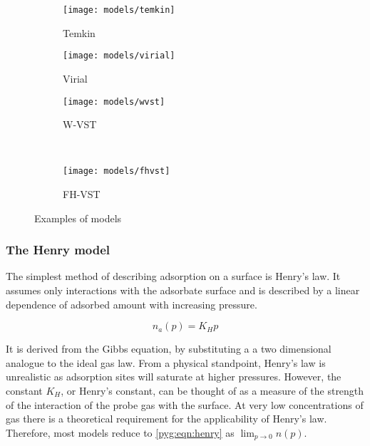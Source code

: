\begin{figure}[p]
\begin{subfigure}{0.3\linewidth}
		\parbox[c]{1.0\linewidth}{\caption{Temkin}%
			\label{pyg:fgr:temkinex}}

		\parbox[b]{1.0\linewidth}{%

			\texttt{[image: models/temkin]}}
	\end{subfigure}
	\begin{subfigure}{0.3\linewidth}

		\parbox[c]{1.0\linewidth}{\caption{Virial}%
			\label{pyg:fgr:virialex}}

		\parbox[b]{1.0\linewidth}{%

			\texttt{[image: models/virial]}}
	\end{subfigure}
	\begin{subfigure}{0.3\linewidth}

		\parbox[c]{1.0\linewidth}{\caption{W-VST}%
			\label{pyg:fgr:wsvstex}}

		\parbox[b]{1.0\linewidth}{%

			\texttt{[image: models/wvst]}}
	\end{subfigure}
	\\
	\begin{subfigure}{0.3\linewidth}

		\parbox[c]{1.0\linewidth}{\caption{FH-VST}%
			\label{pyg:fgr:fhvstex}}

		\parbox[b]{1.0\linewidth}{%

			\texttt{[image: models/fhvst]}}
	\end{subfigure}

	\caption{Examples of models
	}%
	\label{pyg:fgr:modelex}
\end{figure}

\subsubsection{The Henry model}\label{pyg:models:henry}

The simplest method of describing adsorption on a
surface is Henry’s law. It assumes only interactions
with the adsorbate surface and is described by a
linear dependence of adsorbed amount with
increasing pressure.

\begin{equation}\label{pyg:eqn:henry}
	n_a(p) = K_H p
\end{equation}

It is derived from the Gibbs equation, by substituting a
a two dimensional analogue to the ideal gas law.
From a physical standpoint, Henry's law is unrealistic as adsorption sites
will saturate at higher pressures. However, the constant \(K_H\),
or Henry’s constant, can be thought of as a measure of the strength
of the interaction of the probe gas with the surface. At very
low concentrations of gas there is a
theoretical requirement for the applicability of Henry's law.
Therefore, most models reduce to \autoref{pyg:eqn:henry}
as \(\lim_{p \to 0} n(p)\).

